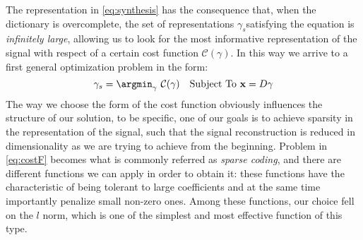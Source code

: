 The representation in \ref{eq:synthesis} has the consequence that, when the dictionary is overcomplete, the set of representations $\gamma_s$satisfying the equation is \textit{infinitely large}, allowing us to look for the most informative representation of the signal with respect of a certain cost function $\mathcal{C}(\gamma)$. In this way we arrive to a first general optimization problem in the form:
\begin{equation}
\gamma_s = \argmin_{\gamma} \text{  } \mathcal{C}(\gamma) \quad \text{Subject To  } \textbf{x} = \textbf{$D\gamma$}
\label{eq:costF}
\end{equation}
The way we choose the form of the cost function obviously influences the structure of our solution, to be specific, one of our goals is to achieve sparsity in the representation of the signal, such that the signal reconstruction is reduced in dimensionality as we are trying to achieve from the beginning. Problem in \ref{eq:costF} becomes what is commonly referred as \textit{sparse coding}, and there are different functions we can apply in order to obtain it: these functions have the characteristic of being tolerant to large coefficients and at the same time importantly penalize small non-zero ones. Among these functions, our choice fell on the $l$ norm, which is one of the simplest and most effective function of this type.

